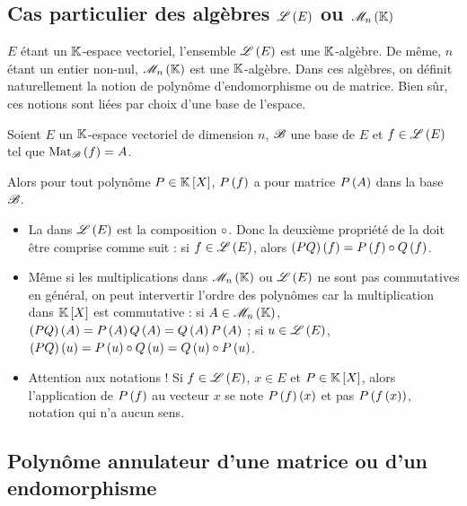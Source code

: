 \subsection{Cas particulier des algèbres \(\mathscr{L}\left(E\right)\) ou \(\M{n}\)}

\(E\) étant un \(\mathbb{K}\)-espace vectoriel, l'ensemble \(\mathscr{L}\left(E\right)\) est une \(\mathbb{K}\)-algèbre. De même, \(n\) étant un entier non-nul, \(\M{n}\) est une \(\mathbb{K}\)-algèbre. Dans ces algèbres, on définit naturellement la notion de polynôme d'endomorphisme ou de matrice. Bien sûr, ces notions sont liées par choix d'une base de l'espace.

\begin{prop}
Soient \(E\) un \(\mathbb{K}\)-espace vectoriel de dimension \(n\), \(\mathscr{B}\) une base de \(E\) et \(f\in\mathscr{L}\left(E\right)\) tel que \(\Mat{f}=A\).

Alors pour tout polynôme \(P\in\poly\), \(P\left(f\right)\) a pour matrice \(P\left(A\right)\) dans la base \(\mathscr{B}\).
\end{prop}

\begin{rem}
\begin{itemize}
    \item La  dans \(\mathscr{L}\left(E\right)\) est la composition \(\circ\). Donc la deuxième propriété de la  doit être comprise comme suit : si \(f\in\mathscr{L}\left(E\right)\), alors \(\left(PQ\right)\left(f\right)=P\left(f\right)\circ Q\left(f\right)\). \\
    \item Même si les multiplications dans \(\M{n}\) ou \(\mathscr{L}\left(E\right)\) ne sont pas commutatives en général, on peut intervertir l'ordre des polynômes car la multiplication dans \(\poly\) est commutative : si \(A\in\M{n}\), \(\left(PQ\right)\left(A\right)=P\left(A\right)Q\left(A\right)=Q\left(A\right)P\left(A\right)\) ; si \(u\in\mathscr{L}\left(E\right)\), \(\left(PQ\right)\left(u\right)=P\left(u\right)\circ Q\left(u\right)=Q\left(u\right)\circ P\left(u\right)\). \\
    \item Attention aux notations ! Si \(f\in\mathscr{L}\left(E\right)\), \(x\in E\) et \(P\in\poly\), alors l'application de \(P\left(f\right)\) au vecteur \(x\) se note \(P\left(f\right)\left(x\right)\) et pas \(P\left(f\left(x\right)\right)\), notation qui n'a aucun sens.
\end{itemize}
\end{rem}

\subsection{Polynôme annulateur d'une matrice ou d'un endomorphisme}

